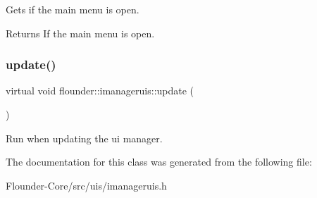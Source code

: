 Gets if the main menu is open. 

\begin{DoxyReturn}{Returns}
If the main menu is open. 
\end{DoxyReturn}
\mbox{\label{classflounder_1_1imanageruis_a55a6b9eab0233c51c12b8819ba264b95}} 
\subsubsection{\texorpdfstring{update()}{update()}}
{\footnotesize\ttfamily virtual void flounder\+::imanageruis\+::update (\begin{DoxyParamCaption}{ }\end{DoxyParamCaption})\hspace{0.3cm}{\ttfamily [pure virtual]}}



Run when updating the ui manager. 



The documentation for this class was generated from the following file\+:\begin{DoxyCompactItemize}
\item 
Flounder-\/\+Core/src/uis/imanageruis.\+h\end{DoxyCompactItemize}
